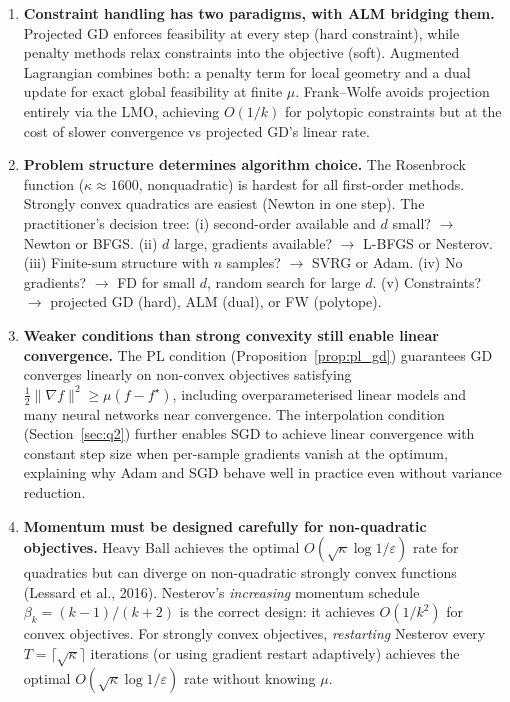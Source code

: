 \documentclass[11pt,a4paper]{article}
\theoremstyle{definition}
\begin{document}
\begin{enumerate}
\item \textbf{Constraint handling has two paradigms, with ALM bridging them.} Projected GD enforces feasibility at every step (hard constraint), while penalty methods relax constraints into the objective (soft). Augmented Lagrangian combines both: a penalty term for local geometry and a dual update for exact global feasibility at finite $\mu$. Frank--Wolfe avoids projection entirely via the LMO, achieving $O(1/k)$ for polytopic constraints but at the cost of slower convergence vs projected GD's linear rate.

\item \textbf{Problem structure determines algorithm choice.} The Rosenbrock function ($\kappa \approx 1600$, nonquadratic) is hardest for all first-order methods. Strongly convex quadratics are easiest (Newton in one step). The practitioner's decision tree: (i) second-order available and $d$ small? $\to$ Newton or BFGS. (ii) $d$ large, gradients available? $\to$ L-BFGS or Nesterov. (iii) Finite-sum structure with $n$ samples? $\to$ SVRG or Adam. (iv) No gradients? $\to$ FD for small $d$, random search for large $d$. (v) Constraints? $\to$ projected GD (hard), ALM (dual), or FW (polytope).

\item \textbf{Weaker conditions than strong convexity still enable linear convergence.} The PL condition (Proposition~\ref{prop:pl_gd}) guarantees GD converges linearly on non-convex objectives satisfying $\frac{1}{2}\|\nabla f\|^2 \geq \mu(f - f^{\star})$, including overparameterised linear models and many neural networks near convergence. The interpolation condition (Section~\ref{sec:q2}) further enables SGD to achieve linear convergence with constant step size when per-sample gradients vanish at the optimum, explaining why Adam and SGD behave well in practice even without variance reduction.

\item \textbf{Momentum must be designed carefully for non-quadratic objectives.} Heavy Ball achieves the optimal $O(\sqrt{\kappa}\log 1/\varepsilon)$ rate for quadratics but can diverge on non-quadratic strongly convex functions (Lessard et al., 2016). Nesterov's \emph{increasing} momentum schedule $\beta_k = (k-1)/(k+2)$ is the correct design: it achieves $O(1/k^2)$ for convex objectives. For strongly convex objectives, \emph{restarting} Nesterov every $T = \lceil\sqrt{\kappa}\rceil$ iterations (or using gradient restart adaptively) achieves the optimal $O(\sqrt{\kappa}\log 1/\varepsilon)$ rate without knowing $\mu$.
\end{enumerate}
\end{document}

